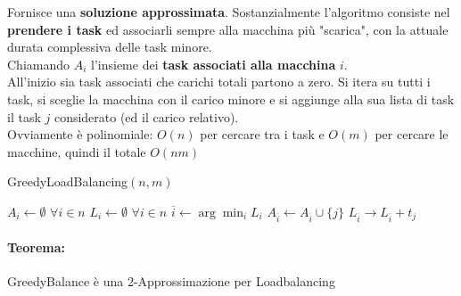 Fornisce una \textbf{soluzione approssimata}. Sostanzialmente l'algoritmo consiste nel \textbf{prendere i task} ed associarli sempre alla macchina più "scarica", con la attuale durata complessiva delle task minore.\\

Chiamando $A_i$ l'insieme dei \textbf{task associati alla macchina} $i$.\\

All'inizio sia task associati che carichi totali partono a zero. Si itera su tutti i task, si sceglie la macchina con il carico minore e si aggiunge alla sua lista di task il task $j$ considerato (ed il carico relativo).\\
Ovviamente è polinomiale: $O(n)$ per cercare tra i task e $O(m)$ per cercare le macchine, quindi il totale $O(nm)$

\begin{algorithm}
	\caption{GreedyLoadBalancing$(n, m)$}
	\begin{algorithmic}
		\STATE $A_i \leftarrow \emptyset$ $\forall i \in n$
		\STATE $L_i \leftarrow \emptyset$ $\forall i \in n$
		\STATE $\overline{i} \leftarrow \arg \min_i L_i$
		\STATE $A_{\overline{i}} \leftarrow A_{\overline{i}} \cup \{j\}$
		\STATE $L_{\overline{i}} \rightarrow L_{\overline{i}} + t_j$
		\ENDFOR
	\end{algorithmic}
\end{algorithm}

\paragraph{Teorema:} GreedyBalance è una 2-Approssimazione per Loadbalancing

